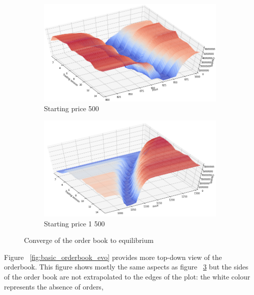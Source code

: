 \begin{figure}[H]
    \centering
    \begin{subfigure}{.5\textwidth}
      \centering
      \includegraphics[width=\linewidth]{plots/basic_market_depth_converge_lower.png}
      \caption{Starting price 500}
      \label{fig:market_depth_lower}
    \end{subfigure}%
    \begin{subfigure}{.5\textwidth}
      \centering
      \includegraphics[width=\linewidth]{plots/basic_market_depth_converge_higher.png}
      \caption{Starting price 1 500}
      \label{fig:market_depth_higher}
    \end{subfigure}
    \caption{Converge of the order book to equilibrium}
    \label{fig:market_depths}
\end{figure}
Figure ~\ref{fig:basic_orderbook_evo} provides more top-down view of the orderbook.
This figure shows mostly the same aspects as figure ~\ref{fig:market_depths} but the sides of the 
order book are not extrapolated to the edges of the plot: the white colour represents the absence of orders,
